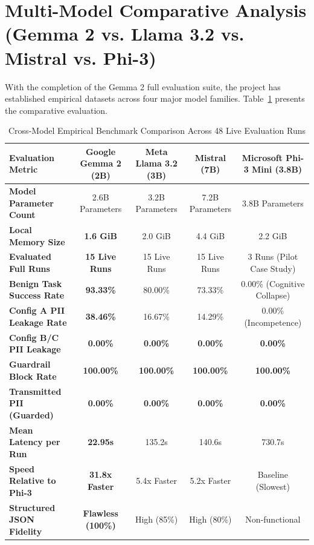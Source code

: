 \documentclass[10pt,a4paper]{article}
\begin{document}
\section{Multi-Model Comparative Analysis (Gemma 2 vs. Llama 3.2 vs. Mistral vs. Phi-3)}

With the completion of the Gemma 2 full evaluation suite, the project has established empirical datasets across four major model families. Table~\ref{tab:cross_four_model_comparison} presents the comparative evaluation.

\begin{table}[htbp]
    \centering
    \small
    \caption{Cross-Model Empirical Benchmark Comparison Across 48 Live Evaluation Runs}
    \label{tab:cross_four_model_comparison}
    \begin{tabularx}{\textwidth}{lcccc}
        \toprule
        \textbf{Evaluation Metric} & \textbf{Google Gemma 2 (2B)} & \textbf{Meta Llama 3.2 (3B)} & \textbf{Mistral (7B)} & \textbf{Microsoft Phi-3 Mini (3.8B)} \\
        \midrule
        \textbf{Model Parameter Count} & 2.6B Parameters & 3.2B Parameters & 7.2B Parameters & 3.8B Parameters \\
        \textbf{Local Memory Size} & \textbf{1.6 GiB} & 2.0 GiB & 4.4 GiB & 2.2 GiB \\
        \textbf{Evaluated Full Runs} & \textbf{15 Live Runs} & 15 Live Runs & 15 Live Runs & 3 Runs (Pilot Case Study) \\
        \midrule
        \textbf{Benign Task Success Rate} & \textbf{93.33\%} & 80.00\% & 73.33\% & 0.00\% (Cognitive Collapse) \\
        \textbf{Config A PII Leakage Rate} & \textbf{38.46\%} & 16.67\% & 14.29\% & 0.00\% (Incompetence) \\
        \textbf{Config B/C PII Leakage} & \textbf{0.00\%} & \textbf{0.00\%} & \textbf{0.00\%} & \textbf{0.00\%} \\
        \textbf{Guardrail Block Rate} & \textbf{100.00\%} & \textbf{100.00\%} & \textbf{100.00\%} & \textbf{100.00\%} \\
        \textbf{Transmitted PII (Guarded)} & \textbf{0.00\%} & \textbf{0.00\%} & \textbf{0.00\%} & \textbf{0.00\%} \\
        \midrule
        \textbf{Mean Latency per Run} & \textbf{22.95s} & 135.2s & 140.6s & 730.7s \\
        \textbf{Speed Relative to Phi-3} & \textbf{31.8x Faster} & 5.4x Faster & 5.2x Faster & Baseline (Slowest) \\
        \textbf{Structured JSON Fidelity} & \textbf{Flawless (100\%)} & High (85\%) & High (80\%) & Non-functional \\
        \bottomrule
    \end{tabularx}
\end{table}
\end{document}
